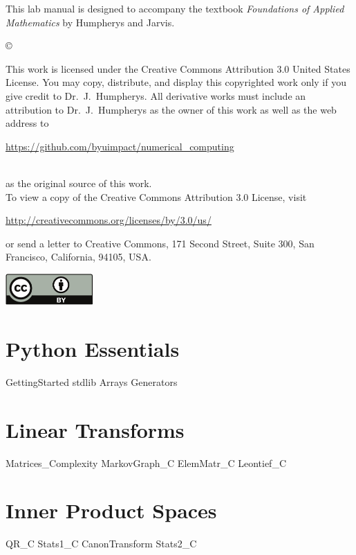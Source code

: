 \documentclass[nociteref]{newsiambook}
\begin{document}
\begin{thepreface}
This lab manual is designed to accompany the textbook \emph{Foundations of Applied Mathematics} by Humpherys and Jarvis.

\vfill
\copyright{This work is licensed under the Creative Commons Attribution 3.0 United States 
License.  You may copy, distribute, and display this copyrighted work only if you give 
credit to Dr.~J.~Humpherys. All derivative works must include an attribution to Dr.~J.~Humpherys as the owner of this work as well as the web address to 
\\\centerline{\url{https://github.com/byuimpact/numerical_computing}}\\ as the original source of 
this 
work.\\To view a copy of the Creative Commons Attribution 3.0 License, 
visit\\\centerline{\url{http://creativecommons.org/licenses/by/3.0/us/}} or send a letter to 
Creative Commons, 171 Second Street, Suite 300, San Francisco, California, 94105, USA.}

\vfill
\centering\includegraphics[height=1.2cm]{by}
\vfill
\end{thepreface}

\setcounter{tocdepth}{1}
\tableofcontents

\mainmatter

\part{Python Essentials}
{GettingStarted}
{stdlib}
{Arrays}
{Generators}

\part{Linear Transforms}
{Matrices_Complexity}
{MarkovGraph_C}
{ElemMatr_C}
{Leontief_C}

\part{Inner Product Spaces}
{QR_C}
{Stats1_C}
{CanonTransform} 
{Stats2_C}
\end{document}

